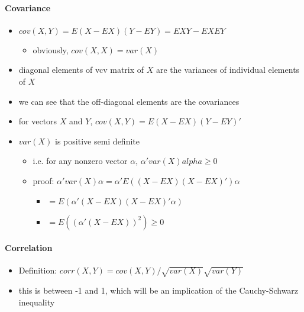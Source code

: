 \paragraph{Covariance}
\begin{itemize}
\item $cov(X,Y) = E(X - E X) (Y - EY) = E XY - EX EY$
\begin{itemize}
\item obviously, $cov(X,X) = var(X)$
\end{itemize}
\item diagonal elements of vcv matrix of $X$ are the variances of individual elements of $X$
\item we can see that the off-diagonal elements are the covariances
\item for vectors $X$ and $Y$, $cov(X,Y) = E(X - EX)(Y - EY)'$
\item $var(X)$ is positive semi definite
\begin{itemize}
\item i.e. for any nonzero vector $\alpha$, $\alpha' var(X)
            alpha \geq 0$
\item proof: $\alpha'var(X) \alpha = \alpha' E((X - EX)(X -
            EX)') \alpha$
\begin{itemize}
\item $= E(\alpha'(X - EX)(X - EX)' \alpha)$
\item $= E((\alpha'(X-EX))^2) \geq 0$
\end{itemize}
\end{itemize}
\end{itemize}

\paragraph{Correlation}
\begin{itemize}
\item Definition: $corr(X, Y) = cov(X,Y) / \sqrt{var(X)} \sqrt{var(Y)}$
\item this is between -1 and 1, which will be an implication of the Cauchy-Schwarz inequality
\end{itemize}

